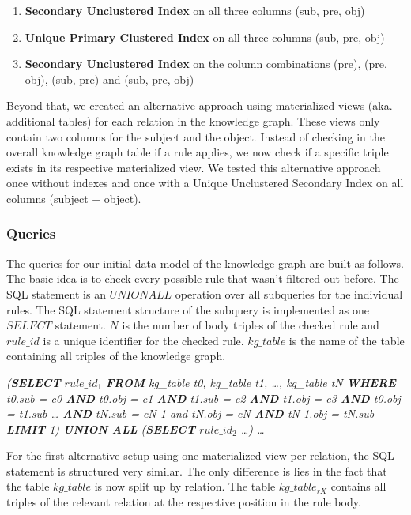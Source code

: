 \documentclass[runningheads]{llncs}
\begin{document}
\begin{enumerate}
  \item \textbf{Secondary Unclustered Index} on all three columns (sub, pre, obj)
  \item \textbf{Unique Primary Clustered Index} on all three columns (sub, pre, obj)
  \item \textbf{Secondary Unclustered Index} on the column combinations (pre), (pre, obj), (sub, pre) and (sub, pre, obj)
\end{enumerate}

Beyond that, we created an alternative approach using materialized views (aka. additional tables) for each relation in the knowledge graph. These views only contain two columns for the subject and the object. Instead of checking in the overall knowledge graph table if a rule applies, we now check if a specific triple exists in its respective materialized view. We tested this alternative approach once without indexes and once with a Unique Unclustered Secondary Index on all columns (subject + object).

\subsubsection{Queries}
The queries for our initial data model of the knowledge graph are built as follows. The basic idea is to check every possible rule that wasn't filtered out before. The SQL statement is an \(UNION ALL\) operation over all subqueries for the individual rules. The SQL statement structure of the subquery is implemented as one \(SELECT\) statement. \(N\) is the number of body triples of the checked rule and \(rule\_id\) is a unique identifier for the checked rule. \(kg\_table\) is the name of the table containing all triples of the knowledge graph. 
\newline

\noindent
\textit{(\textbf{SELECT} $rule\_id_1$ \textbf{FROM} kg\_table t0, kg\_table t1, …, kg\_table tN \textbf{WHERE}  t0.sub = c0 \textbf{AND} t0.obj = c1 \textbf{AND} t1.sub = c2 \textbf{AND} t1.obj = c3 \textbf{AND} t0.obj = t1.sub … \textbf{AND} tN.sub = cN-1 and tN.obj = cN \textbf{AND} tN-1.obj = tN.sub \textbf{LIMIT} 1) \textbf{UNION ALL} (\textbf{SELECT} $rule\_id_2$ …) …}
\newline

\noindent
For the first alternative setup using one materialized view per relation, the SQL statement is structured very similar. The only difference is lies in the fact that the table \(kg\_table\) is now split up by relation. The table \(kg\_table_{rX}\) contains all triples of the relevant relation at the respective position in the rule body.
\newline
\end{document}
